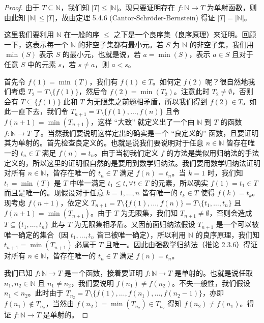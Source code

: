 \begin{proof}
由于 $T \subseteq \mathbb{N}$，我们知 $|T| \leq |\mathbb{N}|$。现只要证明存在 $f : \mathbb{N} \to T$ 为单射函数，则由此知 $|\mathbb{N}| \leq |T|$，故由定理 5.4.6 (Cantor-Schröder-Bernstein) 得证 $|T| = |\mathbb{N}|$。

这里我们要利用 $\mathbb{N}$ 在一般的序 $\leq$ 之下是一个良序集（良序原理）来证明。回顾一下，这表示每一个 $\mathbb{N}$ 的非空子集都有最小元。若 $S$ 为 $\mathbb{N}$ 的非空子集，我们用 $\min(S)$ 表示 $S$ 的最小元，也就是说，若 $a = \min(S)$，表示 $a \in S$ 且对于任意 $S$ 中的元素 $s$，若 $s \neq a$，则 $a < s$。

首先令 $f(1) = \min(T)$，我们有 $f(1) \in T$。如何定 $f(2)$ 呢？很自然地我们考虑 $T_2 = T \setminus \{f(1)\}$，然后令 $f(2) = \min(T_2)$。注意此时 $T_2 \neq \emptyset$，否则会有 $T \subseteq \{f(1)\}$ 此和 $T$ 为无限集之前题相矛盾，所以我们得到 $f(2) \in T$。如此一直下去，我们令 $T_{n+1} = T \setminus \{f(1), \dots, f(n)\}$ 且令 $f(n+1) = \min(T_{n+1})$，这样 “大致” 就定义出了一个由 $\mathbb{N}$ 到 $T$ 的函数 $f : \mathbb{N} \to T$ 了。当然我们要说明这样定出的确实是一个 “良定义的” 函数，且要证明其为单射的。首先检查良定义的。也就是说我们要说明对于任意 $n \in \mathbb{N}$ 皆存在唯一的 $t_n \in T$ 满足 $f(n) = t_n$。由于当初我们定义 $f$ 的方法是类似用归纳法的手法定义的，所以这里的证明很自然的是要用到数学归纳法。我们要用数学归纳法证明对所有 $n \in \mathbb{N}$，皆存在唯一的 $t_n \in T$ 满足 $f(n) = t_n$。当 $k = 1$ 时，我们知 $t_1 = \min(T)$ 是 $T$ 中唯一满足 $t_1 \leq t, \forall t \in T$ 的元素，所以确实 $f(1) = t_1 \in T$ 而且是唯一的。现假设对于任意 $k = 1, \dots, n$ 皆有唯一的 $t_k \in T$ 使得 $f(k) = t_k$。现考虑 $f(n+1)$，依定义 $T_{n+1} = T \setminus \{f(1), \dots, f(n)\} = T \setminus \{t_1, \dots, t_n\}$ 且 $f(n+1) = \min(T_{n+1})$。由于 $T$ 为无限集，我们知 $T_{n+1} \neq \emptyset$，否则会造成 $T \subseteq \{t_1, \dots, t_n\}$ 此与 $T$ 为无限集相矛盾。又因前面归纳法假设 $T_{n+1}$ 是一个可以被唯一确定的集合（因 $t_1, \dots, t_n$ 皆已被唯一确定），所以利用 $\mathbb{N}$ 的良序原理，我们知 $t_{n+1} = \min(T_{n+1})$ 必属于 $T$ 且唯一。因此由强数学归纳法（推论 2.3.6）得证对所有 $n \in \mathbb{N}$，皆存在唯一的 $t_n \in T$ 满足 $f(n) = t_n$。

我们已知 $f : \mathbb{N} \to T$ 是一个函数，接着要证明 $f : \mathbb{N} \to T$ 是单射的。也就是说任取 $n_1, n_2 \in \mathbb{N}$ 且 $n_1 \neq n_2$，我们要说明 $f(n_1) \neq f(n_2)$。不失一般性，我们假设 $n_1 < n_2$。此时由于 $T_{n_2} = T \setminus \{f(1), \dots, f(n_1), \dots, f(n_2-1)\}$，亦即 $f(n_1) \notin T_{n_2}$，当然由 $f(n_2) = \min(T_{n_2}) \in T_{n_2}$ 得知 $f(n_2) \neq f(n_1)$。得证 $f : \mathbb{N} \to T$ 是单射的。
\end{proof}

